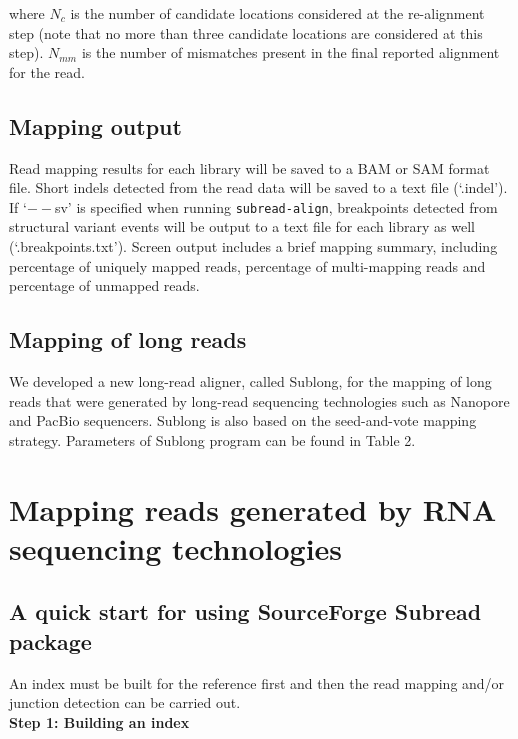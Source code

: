 \documentclass[12pt]{report}
\newcommand{\code}[1]{{\small\texttt{#1}}}
\newcommand{\Subread}{\textsf{Subread}}
\newcommand{\Sublong}{\textsf{Sublong}}
\begin{document}
\noindent where $N_c$ is the number of candidate locations considered at the re-alignment step (note that no more than three candidate locations are considered at this step).
$N_{mm}$ is the number of mismatches present in the final reported alignment for the read.


\section{Mapping output}

Read mapping results for each library will be saved to a BAM or SAM format file.
Short indels detected from the read data will be saved to a text file (`.indel').
If `$--$sv' is specified when running \code{subread-align}, breakpoints detected from structural variant events will be output to a text file for each library as well (`.breakpoints.txt').
Screen output includes a brief mapping summary, including percentage of uniquely mapped reads, percentage of multi-mapping reads and percentage of unmapped reads.


\section{Mapping of long reads}

We developed a new long-read aligner, called {\Sublong}, for the mapping of long reads that were generated by long-read sequencing technologies such as Nanopore and PacBio sequencers.
{\Sublong} is also based on the seed-and-vote mapping strategy.
Parameters of {\Sublong} program can be found in Table 2.

\newpage


\chapter{Mapping reads generated by RNA sequencing technologies}

\section{A quick start for using SourceForge {\Subread} package}

\label{sec:rnaseq-subread}
An index must be built for the reference first and then the read mapping and/or junction detection can be carried out.\\

{\noindent\bf Step 1: Building an index}\\
\end{document}
